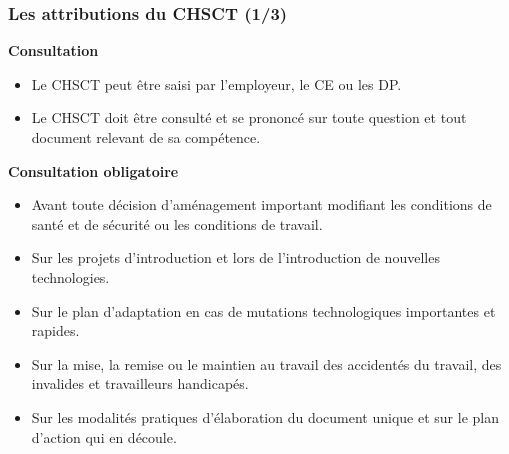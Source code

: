 \documentclass{beamer}
\begin{document}
\begin{frame}
\frametitle{Les attributions du CHSCT (1/3)}

\textbf{Consultation}

\begin{itemize}
        \item Le CHSCT peut être saisi par l'employeur, le CE ou les DP.

        \item Le CHSCT doit être consulté et se prononcé sur toute question et tout document relevant de sa compétence.
\end{itemize}

\textbf{Consultation obligatoire}

\begin{itemize}
        \item Avant toute décision d'aménagement important modifiant les conditions de santé et de sécurité ou les conditions de travail.

        \item Sur les projets d'introduction et lors de l'introduction de nouvelles technologies.

        \item Sur le plan d'adaptation en cas de mutations technologiques importantes et rapides.

        \item Sur la mise, la remise ou le maintien au travail des accidentés du travail, des invalides et travailleurs handicapés.

        \item Sur les modalités  pratiques d'élaboration du document unique et sur le plan d'action qui en découle.
\end{itemize}
\end{frame}
\end{document}
